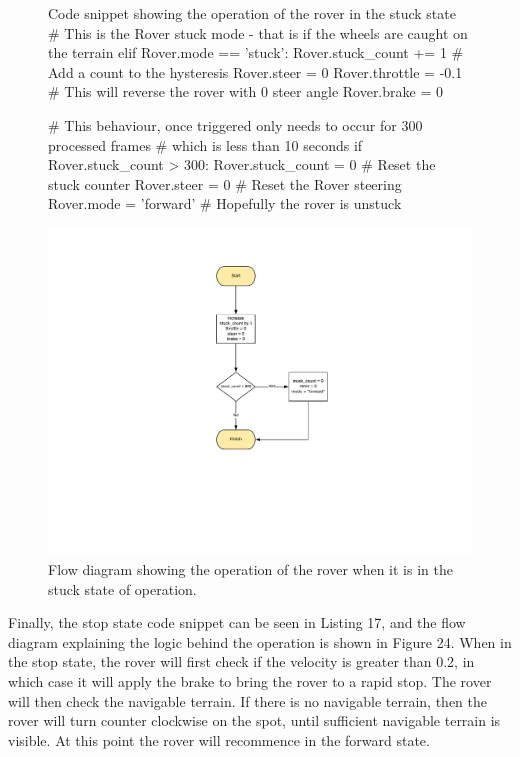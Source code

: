\documentclass[a4paper]{article}
\begin{document}
\begin{figure}[h]\scriptsize
\begin{sexylisting}{Code snippet showing the operation of the rover in the stuck state}
# This is the Rover stuck mode - that is if the wheels are caught on the terrain        
        elif Rover.mode == 'stuck':
            Rover.stuck_count += 1 # Add a count to the hysteresis
            Rover.steer = 0
            Rover.throttle = -0.1 # This will reverse the rover with 0 steer angle
            Rover.brake = 0
            
            # This behaviour, once triggered only needs to occur for 300 processed frames
            # which is less than 10 seconds
            if Rover.stuck_count > 300:
                Rover.stuck_count = 0 # Reset the stuck counter
                Rover.steer = 0 # Reset the Rover steering
                Rover.mode = 'forward' # Hopefully the rover is unstuck
\end{sexylisting}
\end{figure}

\begin{figure}[h]
\hspace{-1.5cm}
\includegraphics[scale=0.7]{stuck_flow}
\vspace{-3cm}
\caption{Flow diagram showing the operation of the rover when it is in the stuck state of operation.}
\end{figure}

\clearpage


Finally, the stop state code snippet can be seen in Listing 17, and the flow diagram explaining the logic behind the operation is shown in Figure 24. When in the stop state, the rover will first check if the velocity is greater than 0.2, in which case it will apply the brake to bring the rover to a rapid stop. The rover will then check the navigable terrain. If there is no navigable terrain, then the rover will turn counter clockwise on the spot, until sufficient navigable terrain is visible. At this point the rover will recommence in the forward state.
\end{document}
